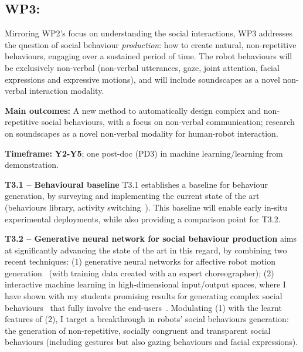 \subsection{WP3: \textbf{\wpThree}} 

Mirroring WP2's focus on understanding the social interactions, WP3 addresses the
question of social behaviour \emph{production}: how to create natural,
non-repetitive behaviours, engaging over a sustained period of time. The robot
behaviours will be exclusively non-verbal (non-verbal utterances, gaze, joint
attention, facial expressions and expressive motions), and will include
soundscapes as a novel non-verbal interaction modality.

\begin{framed}

    \textbf{Main outcomes:} A new method to automatically design complex and
    non-repetitive social behaviours, with a focus on non-verbal communication;
    research on soundscapes as a novel non-verbal modality for human-robot
    interaction.

    \textbf{Timeframe:} \textbf{Y2-Y5}; one post-doc (PD3) in machine learning/learning from
demonstration.

\end{framed}

\textbf{T3.1 -- Behavioural baseline} T3.1 establishes a baseline for behaviour
generation, by surveying and implementing the current state of the art
(behaviours library, activity switching~\cite{coninx2016towards}). This
baseline will enable early in-situ experimental deployments, while also
providing a comparison point for T3.2.

\textbf{T3.2 -- Generative neural network for social behaviour production}
\project aims at significantly advancing the state of the art in this regard, by
combining two recent techniques: (1) generative neural networks for affective
robot motion generation~\cite{marmpena2019generating,suguitan2020moveae} (with
training data created with an expert choreographer); (2) interactive machine
learning in high-dimensional input/output spaces, where I have shown with my
students promising results for generating complex social
behaviours~\cite{senft2019teaching, winkle2020couch} that fully involve the
end-users~\cite{winkle2018social}. Modulating (1) with the learnt features of
(2), I target a breakthrough in robots' social behaviours generation: the
generation of non-repetitive, socially congruent and transparent social
behaviours (including gestures but also gazing behaviours and facial
expressions).

